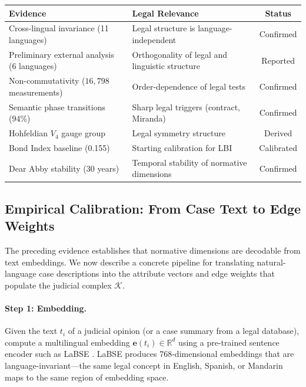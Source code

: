 \documentclass[12pt]{article}
\theoremstyle{definition}
\theoremstyle{remark}
\newcommand{\R}{\mathbb{R}}
\begin{document}
\begin{center}
\begin{tabular}{llc}
\toprule
\textbf{Evidence} & \textbf{Legal Relevance} & \textbf{Status} \\
\midrule
Cross-lingual invariance (11 languages) & Legal structure is language-independent & Confirmed \\
Preliminary external analysis (6 languages) & Orthogonality of legal and linguistic structure & Reported \\
Non-commutativity ($16{,}798$ measurements) & Order-dependence of legal tests & Confirmed \\
Semantic phase transitions (94\%) & Sharp legal triggers (contract, Miranda) & Confirmed \\
Hohfeldian $V_4$ gauge group & Legal symmetry structure & Derived \\
Bond Index baseline (0.155) & Starting calibration for LBI & Calibrated \\
Dear Abby stability (30 years) & Temporal stability of normative dimensions & Confirmed \\
\bottomrule
\end{tabular}
\end{center}

\subsection{Empirical Calibration: From Case Text to Edge Weights}
\label{sec:calibration}

The preceding evidence establishes that normative dimensions are decodable from text embeddings.  We now describe a concrete pipeline for translating natural-language case descriptions into the attribute vectors and edge weights that populate the judicial complex $\mathcal{K}$.

\paragraph{Step 1: Embedding.}  Given the text $t_i$ of a judicial opinion (or a case summary from a legal database), compute a multilingual embedding $\mathbf{e}(t_i) \in \R^d$ using a pre-trained sentence encoder such as LaBSE \cite{feng2022}.  LaBSE produces 768-dimensional embeddings that are language-invariant---the same legal concept in English, Spanish, or Mandarin maps to the same region of embedding space.
\end{document}
